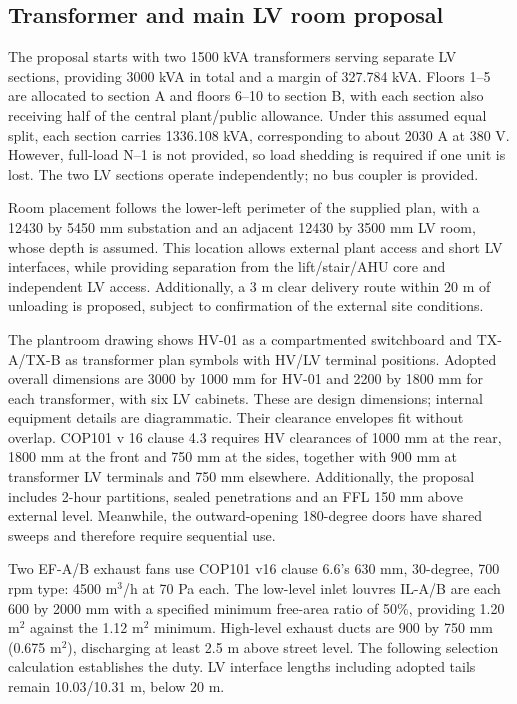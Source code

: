 \subsection*{Transformer and main LV room proposal}
The proposal starts with two 1500 kVA transformers serving separate LV sections, providing 3000 kVA in total and a margin of 327.784 kVA. Floors 1--5 are allocated to section A and floors 6--10 to section B, with each section also receiving half of the central plant/public allowance. Under this assumed equal split, each section carries 1336.108 kVA, corresponding to about 2030 A at 380 V. However, full-load N--1 is not provided, so load shedding is required if one unit is lost. The two LV sections operate independently; no bus coupler is provided.

Room placement follows the lower-left perimeter of the supplied plan, with a 12430 by 5450 mm substation and an adjacent 12430 by 3500 mm LV room, whose depth is assumed. This location allows external plant access and short LV interfaces, while providing separation from the lift/stair/AHU core and independent LV access. Additionally, a 3 m clear delivery route within 20 m of unloading is proposed, subject to confirmation of the external site conditions.

The plantroom drawing shows HV-01 as a compartmented switchboard and TX-A/TX-B as transformer plan symbols with HV/LV terminal positions. Adopted overall dimensions are 3000 by 1000 mm for HV-01 and 2200 by 1800 mm for each transformer, with six LV cabinets. These are design dimensions; internal equipment details are diagrammatic. Their clearance envelopes fit without overlap. COP101 v 16 clause 4.3 requires HV clearances of 1000 mm at the rear, 1800 mm at the front and 750 mm at the sides, together with 900 mm at transformer LV terminals and 750 mm elsewhere. Additionally, the proposal includes 2-hour partitions, sealed penetrations and an FFL 150 mm above external level. Meanwhile, the outward-opening 180-degree doors have shared sweeps and therefore require sequential use.

Two EF-A/B exhaust fans use COP101 v16 clause 6.6's 630 mm, 30-degree, 700 rpm type: 4500 m$^3$/h at 70 Pa each. The low-level inlet louvres IL-A/B are each 600 by 2000 mm with a specified minimum free-area ratio of 50\%, providing 1.20 m$^2$ against the 1.12 m$^2$ minimum. High-level exhaust ducts are 900 by 750 mm (0.675 m$^2$), discharging at least 2.5 m above street level. The following selection calculation establishes the duty. LV interface lengths including adopted tails remain 10.03/10.31 m, below 20 m.

